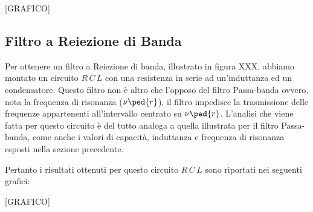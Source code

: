 [GRAFICO]

\subsection*{Filtro a Reiezione di Banda}

Per ottenere un filtro a Reiezione di banda, illustrato in figura XXX, abbiamo montato un circuito $R\,C\,L$ con una resistenza in serie ad un'induttanza ed un condensatore.
Questo filtro non è altro che l'opposo del filtro Passa-banda ovvero, nota la frequenza di risonanza ($\nu\ped{r}$), il filtro impedisce la trasmissione delle frequenze appartenenti all'intervallo centrato su $\nu\ped{r}$. L'analisi che viene fatta per questo circuito è del tutto analoga a quella illustrata per il filtro Passa-banda, come anche i valori di capacità, induttanza e frequenza di risonanza esposti nella sezione precedente.

Pertanto i risultati ottenuti per questo circuito $R\,C\,L$ sono riportati nei seguenti grafici:

[GRAFICO]